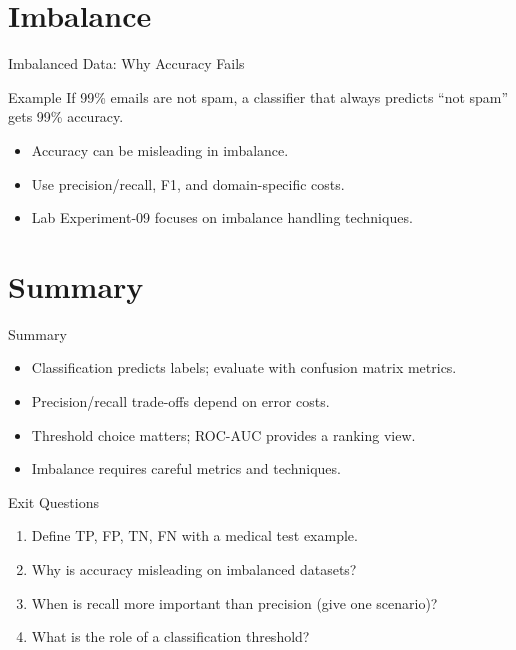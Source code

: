 \documentclass[aspectratio=169]{beamer}
\begin{document}
\section{Imbalance}
\label{sec:imb}

\begin{frame}{Imbalanced Data: Why Accuracy Fails}
  \begin{exampleblock}{Example}
    If 99\% emails are not spam, a classifier that always predicts ``not spam'' gets 99\% accuracy.
  \end{exampleblock}
  \vspace{0.4em}
  \begin{itemize}[<+->]
    \item Accuracy can be misleading in imbalance.
    \item Use precision/recall, F1, and domain-specific costs.
    \item Lab Experiment-09 focuses on imbalance handling techniques.
  \end{itemize}
\end{frame}

\section{Summary}
\label{sec:summary}

\begin{frame}{Summary}
  \begin{itemize}
    \item Classification predicts labels; evaluate with confusion matrix metrics.
    \item Precision/recall trade-offs depend on error costs.
    \item Threshold choice matters; ROC-AUC provides a ranking view.
    \item Imbalance requires careful metrics and techniques.
  \end{itemize}
  \slidesources{\AIMLUnitIVSources}
\end{frame}

\begin{frame}{Exit Questions}
  \begin{enumerate}
    \item Define TP, FP, TN, FN with a medical test example.
    \item Why is accuracy misleading on imbalanced datasets?
    \item When is recall more important than precision (give one scenario)?
    \item What is the role of a classification threshold?
  \end{enumerate}
\end{frame}
\end{document}
